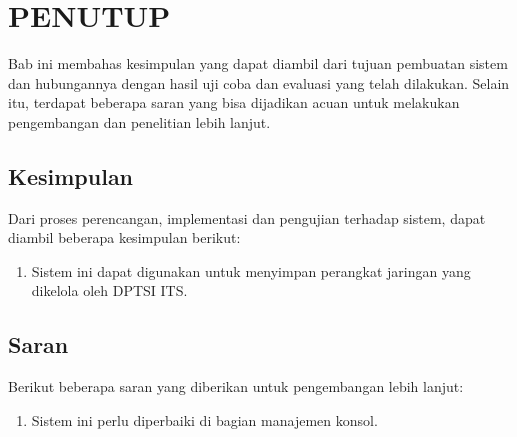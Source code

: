 \chapter{PENUTUP}
    Bab ini membahas kesimpulan yang dapat diambil dari tujuan pembuatan sistem dan hubungannya dengan hasil uji coba dan evaluasi yang telah dilakukan. Selain itu, terdapat beberapa saran yang bisa dijadikan acuan untuk melakukan pengembangan dan penelitian lebih lanjut.
        
	\section{Kesimpulan}
        Dari proses perencangan, implementasi dan pengujian terhadap sistem, dapat diambil beberapa kesimpulan berikut:
		\begin{enumerate}
            \item Sistem ini dapat digunakan untuk menyimpan perangkat jaringan yang dikelola oleh DPTSI ITS.
            
		\end{enumerate}
        
	\section{Saran}
		Berikut beberapa saran yang diberikan untuk pengembangan lebih lanjut:
		\begin{enumerate}
			\item Sistem ini perlu diperbaiki di bagian manajemen konsol. 
		\end{enumerate}